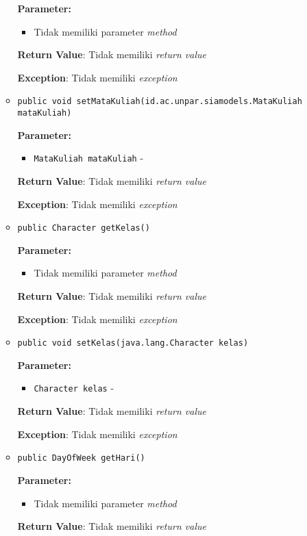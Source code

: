 \documentclass{article}
\begin{document}
\begin{enumerate}
\begin{itemize}
\textbf{Parameter:}
\begin{itemize}
\item Tidak memiliki parameter \textit{method}
\end{itemize}
\textbf{Return Value}: Tidak memiliki \textit{return value}

\textbf{Exception}: Tidak memiliki \textit{exception}

\item \texttt{public void setMataKuliah(id.ac.unpar.siamodels.MataKuliah mataKuliah)}



\textbf{Parameter:}
\begin{itemize}
\item \texttt{MataKuliah mataKuliah} - 
\end{itemize}
\textbf{Return Value}: Tidak memiliki \textit{return value}

\textbf{Exception}: Tidak memiliki \textit{exception}

\item \texttt{public Character getKelas()}



\textbf{Parameter:}
\begin{itemize}
\item Tidak memiliki parameter \textit{method}
\end{itemize}
\textbf{Return Value}: Tidak memiliki \textit{return value}

\textbf{Exception}: Tidak memiliki \textit{exception}

\item \texttt{public void setKelas(java.lang.Character kelas)}



\textbf{Parameter:}
\begin{itemize}
\item \texttt{Character kelas} - 
\end{itemize}
\textbf{Return Value}: Tidak memiliki \textit{return value}

\textbf{Exception}: Tidak memiliki \textit{exception}

\item \texttt{public DayOfWeek getHari()}



\textbf{Parameter:}
\begin{itemize}
\item Tidak memiliki parameter \textit{method}
\end{itemize}
\textbf{Return Value}: Tidak memiliki \textit{return value}


\end{itemize}
\end{enumerate}
\end{document}
